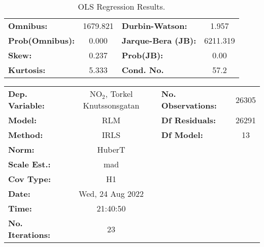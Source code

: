 \begin{landscape}
\begin{table}
\begin{center}
\begin{tabular}{lclc}
\textbf{Omnibus:}       & 1679.821 & \textbf{  Durbin-Watson:     } &    1.957  \\
\textbf{Prob(Omnibus):} &   0.000  & \textbf{  Jarque-Bera (JB):  } & 6211.319  \\
\textbf{Skew:}          &   0.237  & \textbf{  Prob(JB):          } &     0.00  \\
\textbf{Kurtosis:}      &   5.333  & \textbf{  Cond. No.          } &     57.2  \\
\bottomrule
\end{tabular}
\caption{OLS Regression Results.}
\label{tab:OLS_table}
\end{center}
\end{table}
\end{landscape}


\begin{landscape}
\begin{table}
\begin{center}
\begin{tabular}{lclc}
\toprule
\textbf{Dep. Variable:}                                     & NO$_2$, Torkel Knutssonsgatan & \textbf{  No. Observations:  } &    26305    \\
\textbf{Model:}                                             &               RLM                & \textbf{  Df Residuals:      } &    26291    \\
\textbf{Method:}                                            &               IRLS               & \textbf{  Df Model:          } &       13    \\
\textbf{Norm:}                                              &              HuberT              & \textbf{                     } &             \\
\textbf{Scale Est.:}                                        &               mad                & \textbf{                     } &             \\
\textbf{Cov Type:}                                          &                H1                & \textbf{                     } &             \\
\textbf{Date:}                                              &         Wed, 24 Aug 2022         & \textbf{                     } &             \\
\textbf{Time:}                                              &             21:40:50             & \textbf{                     } &             \\
\textbf{No. Iterations:}                                    &                23                & \textbf{                     } &             \\

\end{tabular}
\end{center}
\end{table}
\end{landscape}
